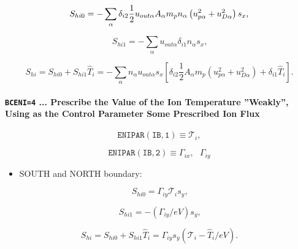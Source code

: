 \documentclass[11pt]{article}
\begin{document}
\begin{equation}
S_{hi0}=-\sum_{\alpha}\delta_{i2}\frac{1}{2}u_{out\alpha}A_{\alpha}m_{p}n_{%
\alpha}\left( u_{p\alpha}^{2}+u_{D\alpha}^{2}\right) s_{x}\text{,} 
\label{c264}
\end{equation}

\begin{equation}
S_{hi1}=-\sum_{\alpha}u_{out\alpha}\delta_{i1}n_{\alpha}s_{x}\text{,} 
\label{c265}
\end{equation}

\begin{equation}
S_{hi}=S_{hi0}+S_{hi1}\widehat{T}_{i}=-\sum_{\alpha}n_{\alpha}u_{out\alpha
}s_{x}\left[ \delta_{i2}\frac{1}{2}A_{\alpha}m_{p}\left(
u_{p\alpha}^{2}+u_{D\alpha}^{2}\right) +\delta_{i1}\widehat{T}_{i}\right] 
\text{.}   \label{c266}
\end{equation}

\bigskip

\paragraph{\texttt{BCENI=4} ... Prescribe the Value of the Ion Temperature
''Weakly'', Using as the Control Parameter Some Prescribed Ion Flux}

\bigskip

\begin{equation*}
\mathtt{ENIPAR(IB,1)}\equiv\mathcal{T}_{i}, 
\end{equation*}

\begin{equation*}
\mathtt{ENIPAR(IB,2)}\equiv\Gamma_{ix},\text{ }\Gamma_{iy}
\end{equation*}

\bigskip

\begin{itemize}
\item  SOUTH and NORTH boundary:
\end{itemize}

\bigskip

\begin{equation}
S_{hi0}=\mathcal{\Gamma}_{iy}\mathcal{T}_{i}s_{y}\text{,}   \label{c267}
\end{equation}

\begin{equation}
S_{hi1}=-\left( \mathcal{\Gamma}_{iy}/eV\right) s_{y}\text{,}   \label{c268}
\end{equation}

\begin{equation}
S_{hi}=S_{hi0}+S_{hi1}\widehat{T}_{i}=\mathcal{\Gamma}_{iy}s_{y}\left( 
\mathcal{T}_{i}-\widehat{T}_{i}/eV\right) \text{.}   \label{c269}
\end{equation}
\end{document}
